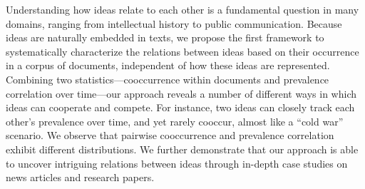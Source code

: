 Understanding how ideas relate to each other is a fundamental question in many domains, ranging from intellectual history to public communication. Because ideas are naturally embedded in texts, we propose the first framework to systematically characterize the relations between ideas based on their occurrence in a corpus of documents, independent of how these ideas are represented. Combining two statistics—cooccurrence within documents and prevalence correlation over time—our approach reveals a number of different ways in which ideas can cooperate and compete. For instance, two ideas can closely track each other's prevalence over time, and yet rarely cooccur, almost like a ``cold war'' scenario. We observe that pairwise cooccurrence and prevalence correlation exhibit different distributions. We further demonstrate that our approach is able to uncover intriguing relations between ideas through in-depth case studies on news articles and research papers.

